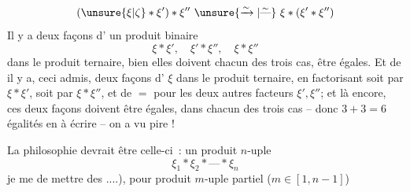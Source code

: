 
\[
(\unsure{\xi|\zeta}*\xi')*\xi''\ \unsure{\xrightarrow{\sim}|\overset{\sim}{\text{---}}}\ \xi*(\xi'*\xi'')
\]
Il  y a deux façons d' un produit binaire
\[
\xi*\xi',\quad \xi'*\xi'',\quad \xi*\xi''
\]
dans le produit ternaire,  bien elles doivent  chacun des trois cas, être égales. Et de  il y a, ceci admis,  deux façons d' $\xi$ dans le produit ternaire, en factorisant soit par $\xi*\xi'$, soit par $\xi*\xi''$, et de $=$ pour les deux autres facteurs $\xi',\xi''$; et là encore, ces deux façons doivent être égales, dans chacun des  trois cas -- donc $3+3=6$ égalités en  à écrire  -- on a vu pire !

La philosophie  devrait être celle-ci~:  un produit $n$-uple
\[
\xi_1*\xi_2*\text{---}*\xi_n
\]
 je me  de mettre des  ....), pour  produit $m$-uple partiel ($m\in[1,n-1]$)
